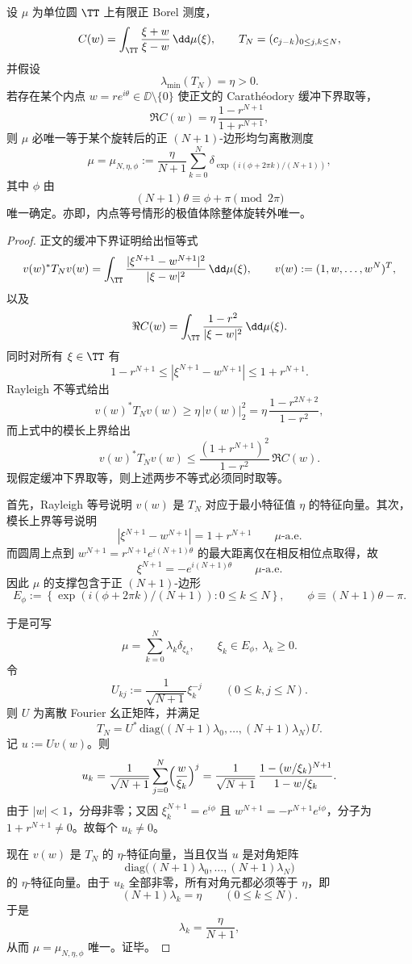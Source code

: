 \begin{theorem}\label{thm:conclusion-toeplitz-buffer-equality-regular-polygon-rigidity}
设 \(\mu\) 为单位圆 \(\TT\) 上有限正 Borel 测度，
\[
C(w)=\int_{\TT}\frac{\xi+w}{\xi-w}\,\dd\mu(\xi),
\qquad
T_N=(c_{j-k})_{0\le j,k\le N},
\]
并假设
\[
\lambda_{\min}(T_N)=\eta>0.
\]
若存在某个内点 \(w=re^{i\theta}\in\DD\setminus\{0\}\) 使正文的 Carath\'eodory 缓冲下界取等，
\[
\Re C(w)=\eta\,\frac{1-r^{N+1}}{1+r^{N+1}},
\]
则 \(\mu\) 必唯一等于某个旋转后的正 \((N+1)\)-边形均匀离散测度
\[
\mu=\mu_{N,\eta,\phi}:=\frac{\eta}{N+1}\sum_{k=0}^{N}
\delta_{\exp(i(\phi+2\pi k)/(N+1))},
\]
其中 \(\phi\) 由
\[
(N+1)\theta\equiv \phi+\pi \pmod{2\pi}
\]
唯一确定。亦即，内点等号情形的极值体除整体旋转外唯一。
\end{theorem}
\begin{proof}
正文的缓冲下界证明给出恒等式
\[
v(w)^*T_Nv(w)
=
\int_{\TT}\frac{|\xi^{N+1}-w^{N+1}|^2}{|\xi-w|^2}\,\dd\mu(\xi),
\qquad
v(w):=(1,w,\dots,w^N)^T,
\]
以及
\[
\Re C(w)=\int_{\TT}\frac{1-r^2}{|\xi-w|^2}\,\dd\mu(\xi).
\]
同时对所有 \(\xi\in\TT\) 有
\[
1-r^{N+1}\le |\xi^{N+1}-w^{N+1}|\le 1+r^{N+1}.
\]
Rayleigh 不等式给出
\[
v(w)^*T_Nv(w)\ge \eta\,|v(w)|_2^2
=\eta\,\frac{1-r^{2N+2}}{1-r^2},
\]
而上式中的模长上界给出
\[
v(w)^*T_Nv(w)\le \frac{(1+r^{N+1})^2}{1-r^2}\,\Re C(w).
\]
现假定缓冲下界取等，则上述两步不等式必须同时取等。

首先，Rayleigh 等号说明 \(v(w)\) 是 \(T_N\) 对应于最小特征值 \(\eta\) 的特征向量。其次，模长上界等号说明
\[
|\xi^{N+1}-w^{N+1}|=1+r^{N+1}
\qquad \mu\text{-a.e.}
\]
而圆周上点到 \(w^{N+1}=r^{N+1}e^{i(N+1)\theta}\) 的最大距离仅在相反相位点取得，故
\[
\xi^{N+1}=-e^{i(N+1)\theta}
\qquad \mu\text{-a.e.}
\]
因此 \(\mu\) 的支撑包含于正 \((N+1)\)-边形
\[
E_\phi:=
\left\{
\exp(i(\phi+2\pi k)/(N+1)):0\le k\le N
\right\},
\qquad
\phi\equiv (N+1)\theta-\pi.
\]

于是可写
\[
\mu=\sum_{k=0}^{N}\lambda_k\delta_{\xi_k},
\qquad
\xi_k\in E_\phi,\ \lambda_k\ge 0.
\]
令
\[
U_{kj}:=\frac{1}{\sqrt{N+1}}\xi_k^{-j}
\qquad(0\le k,j\le N).
\]
则 \(U\) 为离散 Fourier 幺正矩阵，并满足
\[
T_N=U^*\,\mathrm{diag}\bigl((N+1)\lambda_0,\dots,(N+1)\lambda_N\bigr)\,U.
\]
记 \(u:=Uv(w)\)。则
\[
u_k=\frac{1}{\sqrt{N+1}}\sum_{j=0}^{N}\Bigl(\frac{w}{\xi_k}\Bigr)^j
=
\frac{1}{\sqrt{N+1}}\,
\frac{1-(w/\xi_k)^{N+1}}{1-w/\xi_k}.
\]
由于 \(|w|<1\)，分母非零；又因 \(\xi_k^{N+1}=e^{i\phi}\) 且 \(w^{N+1}=-r^{N+1}e^{i\phi}\)，分子为 \(1+r^{N+1}\neq 0\)。故每个 \(u_k\neq 0\)。

现在 \(v(w)\) 是 \(T_N\) 的 \(\eta\)-特征向量，当且仅当 \(u\) 是对角矩阵
\[
\mathrm{diag}\bigl((N+1)\lambda_0,\dots,(N+1)\lambda_N\bigr)
\]
的 \(\eta\)-特征向量。由于 \(u_k\) 全部非零，所有对角元都必须等于 \(\eta\)，即
\[
(N+1)\lambda_k=\eta
\qquad(0\le k\le N).
\]
于是
\[
\lambda_k=\frac{\eta}{N+1},
\]
从而 \(\mu=\mu_{N,\eta,\phi}\) 唯一。证毕。
\end{proof}

